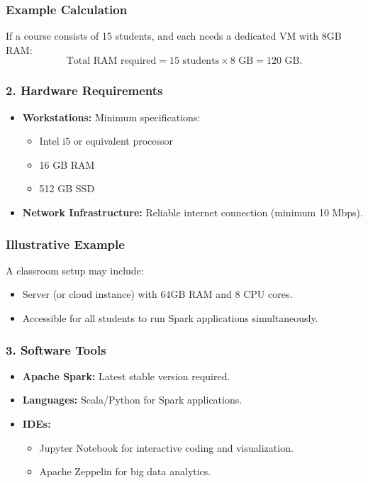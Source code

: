 \documentclass[aspectratio=169]{beamer}
\begin{document}
\begin{frame}
  \frametitle{Example Calculation}
  If a course consists of 15 students, and each needs a dedicated VM with 8GB RAM:
  \begin{equation}
    \text{Total RAM required} = 15 \text{ students} \times 8 \text{ GB} = 120 \text{ GB}.
  \end{equation}
\end{frame}

\begin{frame}
  \frametitle{2. Hardware Requirements}
  \begin{itemize}
    \item \textbf{Workstations:} Minimum specifications:
      \begin{itemize}
        \item Intel i5 or equivalent processor
        \item 16 GB RAM
        \item 512 GB SSD
      \end{itemize}
    \item \textbf{Network Infrastructure:} Reliable internet connection (minimum 10 Mbps).
  \end{itemize}
\end{frame}

\begin{frame}
  \frametitle{Illustrative Example}
  A classroom setup may include:
  \begin{itemize}
    \item Server (or cloud instance) with 64GB RAM and 8 CPU cores.
    \item Accessible for all students to run Spark applications simultaneously.
  \end{itemize}
\end{frame}

\begin{frame}
  \frametitle{3. Software Tools}
  \begin{itemize}
    \item \textbf{Apache Spark:} Latest stable version required.
    \item \textbf{Languages:} Scala/Python for Spark applications.
    \item \textbf{IDEs:}
      \begin{itemize}
        \item Jupyter Notebook for interactive coding and visualization.
        \item Apache Zeppelin for big data analytics.
      \end{itemize}
  \end{itemize}
\end{frame}
\end{document}
